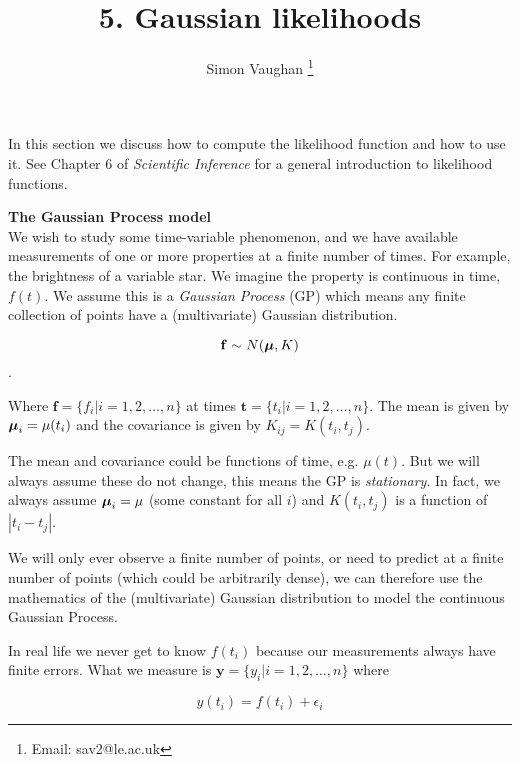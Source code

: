 \documentclass[a4paper, 11pt, amsmath, graphicx]{article}\usepackage[]{graphicx}\usepackage[]{color}
\def\bmu{{\mbox{\boldmath $\mu$}}}
\begin{document}
\title{5. Gaussian likelihoods}
\author{Simon Vaughan \thanks{Email: sav2@le.ac.uk}}
\maketitle

In this section we discuss how to compute the likelihood function and how to use it. See Chapter 6 of \emph{Scientific Inference} for a general introduction to likelihood functions.

\vspace{0.4cm}
\textbf{The Gaussian Process model}
\\

We wish to study some time-variable phenomenon, and we have available measurements of one or more properties at a finite number of times. For example, the brightness of a variable star. We imagine the property is continuous in time, $f(t)$. We assume this is a \emph{Gaussian Process} (GP) which means any finite collection of points have a (multivariate) Gaussian distribution.

\begin{equation}
  \mathbf{f} \sim N(\bmu, K)
\end{equation}.

Where $\mathbf{f} = \{ f_i | i = 1, 2, \ldots, n \}$ at times $\mathbf{t} = \{ t_i | i = 1, 2, \ldots, n \}$. The mean is given by $\bmu_i = \mu(t_i)$ and the covariance is given by $ K_{ij} = K(t_i, t_j)$.

The mean and covariance could be functions of time, e.g. $\mu(t)$. But we will always assume these do not change, this means the GP is \emph{stationary}. In fact, we always assume $\bmu_i = \mu$ (some constant for all $i$) and $K(t_i, t_j)$ is a function of $|t_i - t_j|$.

We will only ever observe a finite number of points, or need to predict at a finite number of points (which could be arbitrarily dense), we can therefore use the mathematics of the (multivariate) Gaussian distribution to model the continuous Gaussian Process. 

In real life we never get to know $f(t_i)$ because our measurements always have finite errors. What we measure is $\mathbf{y} = \{ y_i | i = 1,2,\ldots,n \}$ where

\begin{equation}
  y(t_i) = f(t_i) + \epsilon_i
\end{equation}
\end{document}
